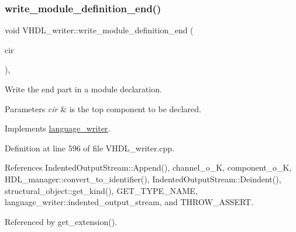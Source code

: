 \subsubsection{\texorpdfstring{write\+\_\+module\+\_\+definition\+\_\+end()}{write\_module\_definition\_end()}}
{\footnotesize\ttfamily void V\+H\+D\+L\+\_\+writer\+::write\+\_\+module\+\_\+definition\+\_\+end (\begin{DoxyParamCaption}\item[{const \hyperlink{structural__objects_8hpp_a8ea5f8cc50ab8f4c31e2751074ff60b2}{structural\+\_\+object\+Ref} \&}]{cir }\end{DoxyParamCaption})\hspace{0.3cm}{\ttfamily [override]}, {\ttfamily [virtual]}}



Write the end part in a module declaration. 


\begin{DoxyParams}{Parameters}
{\em cir} & is the top component to be declared. \\
\hline
\end{DoxyParams}


Implements \hyperlink{classlanguage__writer_a57586ab4a2816a9eeb3658b9f072d02d}{language\+\_\+writer}.



Definition at line 596 of file V\+H\+D\+L\+\_\+writer.\+cpp.



References Indented\+Output\+Stream\+::\+Append(), channel\+\_\+o\+\_\+K, component\+\_\+o\+\_\+K, H\+D\+L\+\_\+manager\+::convert\+\_\+to\+\_\+identifier(), Indented\+Output\+Stream\+::\+Deindent(), structural\+\_\+object\+::get\+\_\+kind(), G\+E\+T\+\_\+\+T\+Y\+P\+E\+\_\+\+N\+A\+ME, language\+\_\+writer\+::indented\+\_\+output\+\_\+stream, and T\+H\+R\+O\+W\+\_\+\+A\+S\+S\+E\+RT.



Referenced by get\+\_\+extension().

